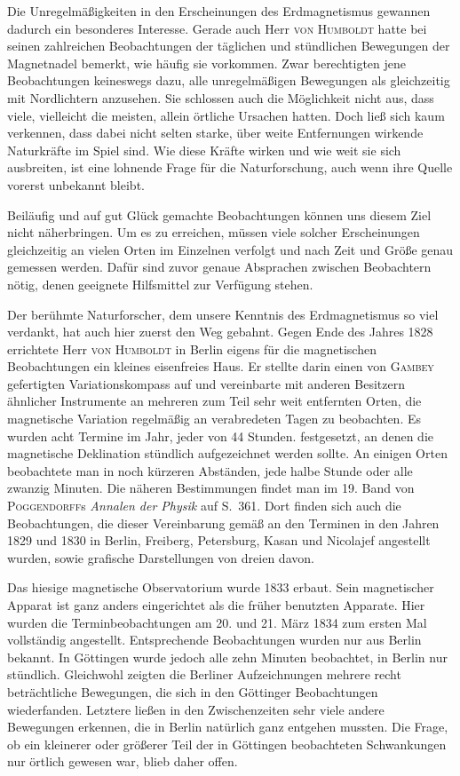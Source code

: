 Die Unregelmäßigkeiten in den Erscheinungen des Erdmagnetismus gewannen dadurch ein besonderes Interesse. Gerade auch Herr \textsc{von Humboldt} hatte bei seinen zahlreichen Beobachtungen der täglichen und stündlichen Bewegungen der Magnetnadel bemerkt, wie häufig sie vorkommen. Zwar berechtigten jene Beobachtungen keineswegs dazu, alle unregelmäßigen Bewegungen als gleichzeitig mit Nordlichtern anzusehen. Sie schlossen auch die Möglichkeit nicht aus, dass viele, vielleicht die meisten, allein örtliche Ursachen hatten. Doch ließ sich kaum verkennen, dass dabei nicht selten starke, über weite Entfernungen wirkende Naturkräfte im Spiel sind. Wie diese Kräfte wirken und wie weit sie sich ausbreiten, ist eine lohnende Frage für die Naturforschung, auch wenn ihre Quelle vorerst unbekannt bleibt.

Beiläufig und auf gut Glück gemachte Beobachtungen können uns diesem Ziel nicht näherbringen. Um es zu erreichen, müssen viele solcher Erscheinungen gleichzeitig an vielen Orten im Einzelnen verfolgt und nach Zeit und Größe genau gemessen werden. Dafür sind zuvor genaue Absprachen zwischen Beobachtern nötig, denen geeignete Hilfsmittel zur Verfügung stehen.

Der berühmte Naturforscher, dem unsere Kenntnis des Erdmagnetismus so viel verdankt, hat auch hier zuerst den Weg gebahnt. Gegen Ende des Jahres 1828 errichtete Herr \textsc{von Humboldt} in Berlin eigens für die magnetischen Beobachtungen ein kleines eisenfreies Haus. Er stellte darin einen von \textsc{Gambey} gefertigten Variationskompass auf und vereinbarte mit anderen Besitzern ähnlicher Instrumente an mehreren zum Teil sehr weit entfernten Orten, die magnetische Variation regelmäßig an verabredeten Tagen zu beobachten. Es wurden acht Termine im Jahr, jeder von 44 Stunden. festgesetzt, an denen die magnetische Deklination stündlich aufgezeichnet werden sollte. An einigen Orten beobachtete man in noch kürzeren Abständen, jede halbe Stunde oder alle zwanzig Minuten. Die näheren Bestimmungen findet man im 19. Band von \textsc{Poggendorff}s \textit{Annalen der Physik} auf S.~361. Dort finden sich auch die Beobachtungen, die dieser Vereinbarung gemäß an den Terminen in den Jahren 1829 und 1830 in Berlin, Freiberg, Petersburg, Kasan und Nicolajef angestellt wurden, sowie grafische Darstellungen von dreien davon.

Das hiesige magnetische Observatorium wurde 1833 erbaut. Sein magnetischer Apparat ist ganz anders eingerichtet als die früher benutzten Apparate. Hier wurden die Terminbeobachtungen am 20. und 21. März 1834 zum ersten Mal vollständig angestellt. Entsprechende Beobachtungen wurden nur aus Berlin bekannt. In Göttingen wurde jedoch alle zehn Minuten beobachtet, in Berlin nur stündlich. Gleichwohl zeigten die Berliner Aufzeichnungen mehrere recht beträchtliche Bewegungen, die sich in den Göttinger Beobachtungen wiederfanden. Letztere ließen in den Zwischenzeiten sehr viele andere Bewegungen erkennen, die in Berlin natürlich ganz entgehen mussten. Die Frage, ob ein kleinerer oder größerer Teil der in Göttingen beobachteten Schwankungen nur örtlich gewesen war, blieb daher offen.

